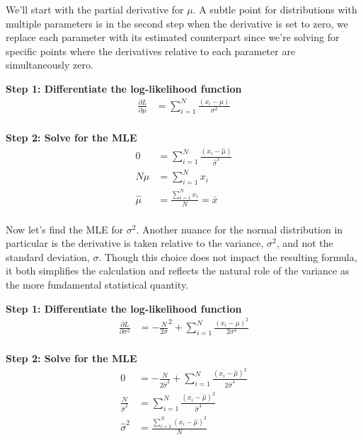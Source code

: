 We'll start with the partial derivative for $\mu$. A subtle point for distributions with multiple parameters is in the second step when the derivative is set to zero, we replace each parameter with its estimated counterpart since we're solving for specific points where the derivatives relative to each parameter are simultaneously zero.

\textbf{Step 1: Differentiate the log-likelihood function}
\begin{align*}
\frac{\partial L}{\partial \mu}
&= \sum_{i=1}^N \frac{\left( x_i- \mu \right)}{\sigma^2} \\
\end{align*}

\textbf{Step 2: Solve for the MLE}
\begin{align*}
0 &= \sum_{i=1}^N \frac{\left( x_i- \hat{\mu} \right)}{\hat{\sigma}^2} \\
N\hat{\mu} &= \sum_{i=1}^N x_i \\
\hat{\mu} &= \frac{\sum_{i=1}^N x_i}{N} = \bar{x} \\
\end{align*}

Now let's find the MLE for $\sigma^2$. Another nuance for the normal distribution in particular is the derivative is taken relative to the variance, $\sigma^2$, and not the standard deviation, $\sigma$. Though this choice does not impact the resulting formula, it both simplifies the calculation and reflects the natural role of the variance as the more fundamental statistical quantity.

\textbf{Step 1: Differentiate the log-likelihood function}
\begin{align*}
\frac{\partial L}{\partial \sigma^2}
&= -\frac{N}{2\sigma}^2 + \sum_{i=1}^N \frac{\left( x_i- \mu \right)^2}{2\sigma^4} \\
\end{align*}

\textbf{Step 2: Solve for the MLE}
\begin{align*}
0 &= -\frac{N}{2\hat{\sigma}^2} + \sum_{i=1}^N \frac{\left( x_i- \hat{\mu} \right)^2}{2\hat{\sigma}^4} \\
\frac{N}{\hat{\sigma}^2} &= \sum_{i=1}^N \frac{\left( x_i- \hat{\mu} \right)^2}{\hat{\sigma}^4} \\
{\hat{\sigma}^2} &= \frac{\sum_{i=1}^N \left( x_i- \hat{\mu} \right)^2}{N} \\
\end{align*}


